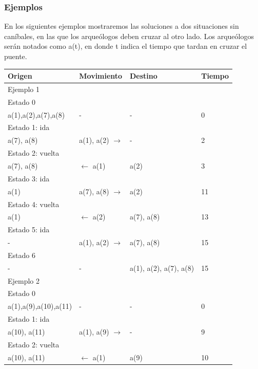 \subsubsection{Ejemplos}
En los siguientes ejemplos mostraremos las soluciones a dos situaciones sin caníbales, en las que los arqueólogos deben cruzar al otro lado. Los arqueólogos serán notados como a(t), en donde t indica el tiempo que tardan en cruzar el puente.
\begin{center}
\begin{tabular}{| l | l | l || l |}
    \hline
    Origen & Movimiento & Destino & Tiempo \\
    \hline
    \multicolumn{4}{|l|}{Ejemplo 1}  \\
    \hline
    \hline
    Estado 0 & & & \\
    a(1),a(2),a(7),a(8) & - & - & 0\\
    \hline
    Estado 1: ida & & &\\
    a(7), a(8) & a(1), a(2) $\rightarrow$ & - & 2\\
    \hline  
    Estado 2: vuelta & & & \\
    a(7), a(8) & $\leftarrow$ a(1) & a(2) & 3\\
    \hline  
    Estado 3: ida & & & \\
    a(1) & a(7), a(8) $\rightarrow$ & a(2) & 11\\
    \hline  
    Estado 4: vuelta & & & \\
    a(1) & $\leftarrow$ a(2) & a(7), a(8) & 13\\
    \hline  
    Estado 5: ida & & & \\
     - & a(1), a(2) $\rightarrow$ & a(7), a(8) & 15\\
    \hline  
    Estado 6 & & & \\
    - & - & a(1), a(2), a(7), a(8) & 15\\
    \hline
    \hline
     \multicolumn{4}{|l|}{Ejemplo 2}  \\
    \hline
    \hline
    Estado 0 & & & \\
    a(1),a(9),a(10),a(11) & - & - & 0\\
    \hline
    Estado 1: ida & & & \\
    a(10), a(11) & a(1), a(9) $\rightarrow$ & - & 9\\
    \hline  
    Estado 2: vuelta & & & \\
    a(10), a(11) & $\leftarrow$ a(1) & a(9) & 10\\

\end{tabular}
\end{center}
